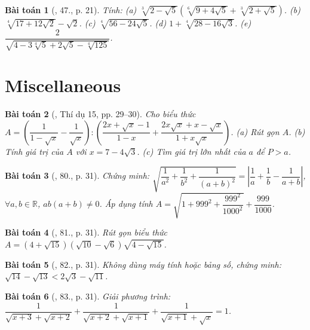 \documentclass{article}
\newtheorem{baitoan}{Bài toán}
\begin{document}
\begin{baitoan}[\cite{Binh_Toan_9_tap_1}, 47., p. 21]
	 Tính: (a) $\sqrt[3]{2 - \sqrt{5}}(\sqrt[6]{9 + 4\sqrt{5}} + \sqrt[3]{2 + \sqrt{5}})$. (b) $\sqrt[4]{17 + 12\sqrt{2}} - \sqrt{2}$. (c) $\sqrt[4]{56 - 24\sqrt{5}}$. (d) $1 + \sqrt[4]{28 - 16\sqrt{3}}$. (e) $\dfrac{2}{\sqrt{4 - 3\sqrt[4]{5} + 2\sqrt{5} - \sqrt[4]{125}}}$.
\end{baitoan}


\section{Miscellaneous}

\begin{baitoan}[\cite{Tuyen_Toan_9}, Thí dụ 15, pp. 29--30]
	Cho biểu thức $A = \left(\dfrac{1}{1 - \sqrt{x}} - \dfrac{1}{\sqrt{x}}\right):\left(\dfrac{2x + \sqrt{x} - 1}{1 - x} + \dfrac{2x\sqrt{x} + x - \sqrt{x}}{1 + x\sqrt{x}}\right)$. (a) Rút gọn $A$. (b) Tính giá trị của $A$ với $x = 7 - 4\sqrt{3}$. (c) Tìm giá trị lớn nhất của $a$ để $P > a$.
\end{baitoan}

\begin{baitoan}[\cite{Tuyen_Toan_9}, 80., p. 31]
	Chứng minh: $\sqrt{\dfrac{1}{a^2} + \dfrac{1}{b^2} + \dfrac{1}{(a + b)^2}} = \left|\dfrac{1}{a} + \dfrac{1}{b} - \dfrac{1}{a + b}\right|$, $\forall a,b\in\mathbb{R}$, $ab(a + b)\ne0$. Áp dụng tính $A = \sqrt{1 + 999^2 + \dfrac{999^2}{1000^2}} + \dfrac{999}{1000}$.
\end{baitoan}

\begin{baitoan}[\cite{Tuyen_Toan_9}, 81., p. 31]
	Rút gọn biểu thức $A = (4 + \sqrt{15})(\sqrt{10} - \sqrt{6})\sqrt{4 - \sqrt{15}}$.
\end{baitoan}

\begin{baitoan}[\cite{Tuyen_Toan_9}, 82., p. 31]
	Không dùng máy tính hoặc bảng số, chứng minh: $\sqrt{14} - \sqrt{13} < 2\sqrt{3} - \sqrt{11}$.
\end{baitoan}

\begin{baitoan}[\cite{Tuyen_Toan_9}, 83., p. 31]
	Giải phương trình: $\dfrac{1}{\sqrt{x + 3} + \sqrt{x + 2}} + \dfrac{1}{\sqrt{x + 2} + \sqrt{x + 1}} + \dfrac{1}{\sqrt{x + 1} + \sqrt{x}} = 1$. 
\end{baitoan}
\end{document}
